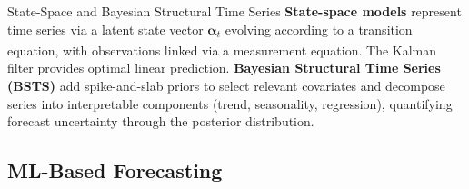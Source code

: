 \begin{v3topic}{State-Space and Bayesian Structural Time Series}
    \textbf{State-space models} represent time series via a latent state vector $\boldsymbol{\alpha}_t$ evolving according to a transition equation, with observations linked via a measurement equation\textsuperscript{\cite[][pp.~293--310]{hyndmanForecastingPrinciples2021}}.
    The Kalman filter provides optimal linear prediction.
    \textbf{Bayesian Structural Time Series (BSTS)} add spike-and-slab priors to select relevant covariates and decompose series into interpretable components (trend, seasonality, regression), quantifying forecast uncertainty through the posterior distribution.

\end{v3topic}

\subsection{ML-Based Forecasting}


